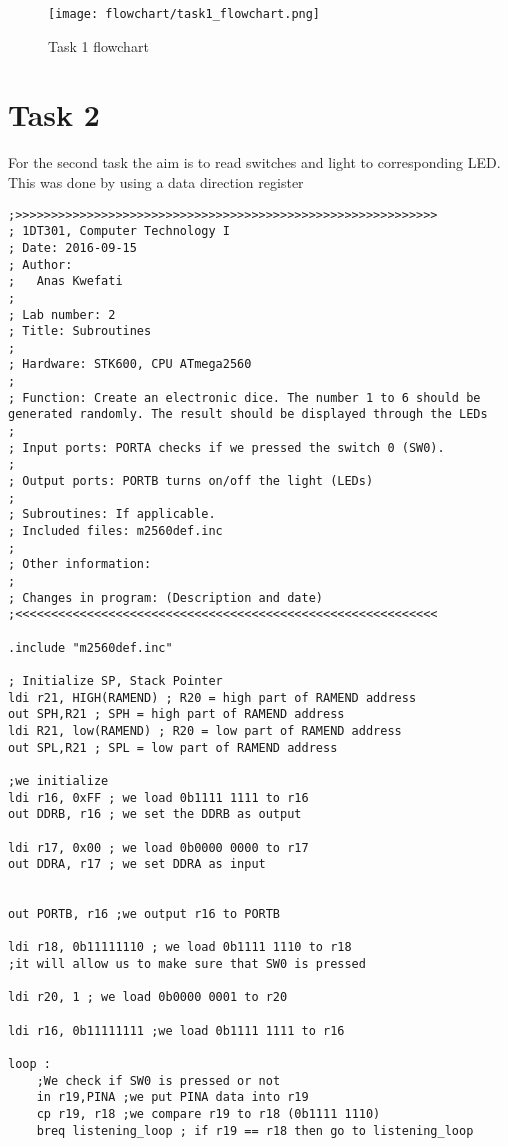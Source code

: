 \documentclass[a4paper,12pt]{article}
\begin{document}
\begin{figure}
\begin{center}
\texttt{[image: flowchart/task1\_flowchart.png]}
\end{center}
\caption{Task 1 flowchart}
\label{task1}
\end{figure}
\break


\section{Task 2}
For the second task the aim is to read switches and light to corresponding LED. This was done by using a data direction register 
\lstset{style=Asm}

\begin{lstlisting}
;>>>>>>>>>>>>>>>>>>>>>>>>>>>>>>>>>>>>>>>>>>>>>>>>>>>>>>>>>>>
; 1DT301, Computer Technology I
; Date: 2016-09-15
; Author:
;	Anas Kwefati
;
; Lab number: 2
; Title: Subroutines
;
; Hardware: STK600, CPU ATmega2560
;
; Function: Create an electronic dice. The number 1 to 6 should be generated randomly. The result should be displayed through the LEDs
;
; Input ports: PORTA checks if we pressed the switch 0 (SW0).
;
; Output ports: PORTB turns on/off the light (LEDs)
;
; Subroutines: If applicable.
; Included files: m2560def.inc
;
; Other information:
;
; Changes in program: (Description and date)
;<<<<<<<<<<<<<<<<<<<<<<<<<<<<<<<<<<<<<<<<<<<<<<<<<<<<<<<<<<<

.include "m2560def.inc"

; Initialize SP, Stack Pointer
ldi r21, HIGH(RAMEND) ; R20 = high part of RAMEND address
out SPH,R21 ; SPH = high part of RAMEND address
ldi R21, low(RAMEND) ; R20 = low part of RAMEND address
out SPL,R21 ; SPL = low part of RAMEND address

;we initialize
ldi r16, 0xFF ; we load 0b1111 1111 to r16
out DDRB, r16 ; we set the DDRB as output

ldi r17, 0x00 ; we load 0b0000 0000 to r17
out DDRA, r17 ; we set DDRA as input


out PORTB, r16 ;we output r16 to PORTB

ldi r18, 0b11111110 ; we load 0b1111 1110 to r18
;it will allow us to make sure that SW0 is pressed

ldi r20, 1 ; we load 0b0000 0001 to r20

ldi r16, 0b11111111 ;we load 0b1111 1111 to r16

loop :
	;We check if SW0 is pressed or not
	in r19,PINA ;we put PINA data into r19
	cp r19, r18 ;we compare r19 to r18 (0b1111 1110)
	breq listening_loop ; if r19 == r18 then go to listening_loop


\end{lstlisting}
\end{document}
